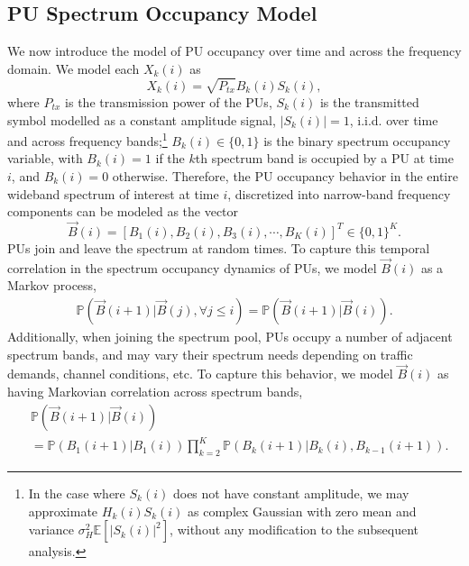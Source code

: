 \documentclass[10pt,twocolumn]{IEEEtran}
\begin{document}
\subsection{PU Spectrum Occupancy Model}
We now introduce the model of PU occupancy over time and across the frequency domain. We model each $X_k(i)$ as 
\begin{equation}\label{4}
    X_k(i) = \sqrt{P_{tx}}B_k(i)S_k(i),
\end{equation}
where $P_{tx}$ is the transmission power of the PUs, $S_k(i)$ is the transmitted symbol modelled as a constant amplitude signal, $|S_k(i)|{=}1$, i.i.d. over time and across frequency bands;\footnote{In the case where $S_k(i)$ does not have constant amplitude, we may approximate $H_{k}(i)S_{k}(i)$ as complex Gaussian with zero mean and variance $\sigma_H^2\mathbb E[|S_{k}(i)|^2]$, without any modification to the subsequent analysis.} $B_k(i){\in}\{0,1\}$ is the binary spectrum occupancy variable, with $B_k(i){=}1$ if the $k$th spectrum band is occupied by a PU at time $i$, and $B_k(i){=}0$ otherwise. Therefore, the PU occupancy behavior in the entire wideband spectrum of interest at time $i$, discretized into narrow-band frequency components can be modeled as the vector 
\begin{equation}\label{5}
    \vec{B}(i) = [B_1(i), B_2(i), B_3(i), \cdots, B_K(i)]^T {\in} \{0, 1\}^K.
\end{equation}
PUs join and leave the spectrum at random times. To capture this temporal correlation in the spectrum occupancy dynamics of PUs, we model $\vec{B}(i)$ as a Markov process,
\begin{equation}\label{6}
    \begin{aligned}
        \mathbb{P}(\vec{B}(i+1)|\vec{B}(j), \forall j \leq i) = \mathbb{P}(\vec{B}(i+1)|\vec{B}(i)).
    \end{aligned}
\end{equation}
Additionally, when joining the spectrum pool, PUs occupy a number of adjacent spectrum bands, and may vary their spectrum needs depending on traffic demands, channel conditions, etc. To capture this behavior, we model $\vec{B}(i)$ as having Markovian correlation across spectrum bands,
\begin{align}\label{7}
&         \mathbb{P}(\vec{B}(i+1)|\vec{B}(i))\\&=
\nonumber
         \mathbb{P}(B_{1}(i+1)|B_{1}(i))
         \prod_{k=2}^{K} \mathbb{P}(B_{k}(i+1)|B_{k}(i), B_{k-1}(i+1)).
\end{align}
\end{document}
